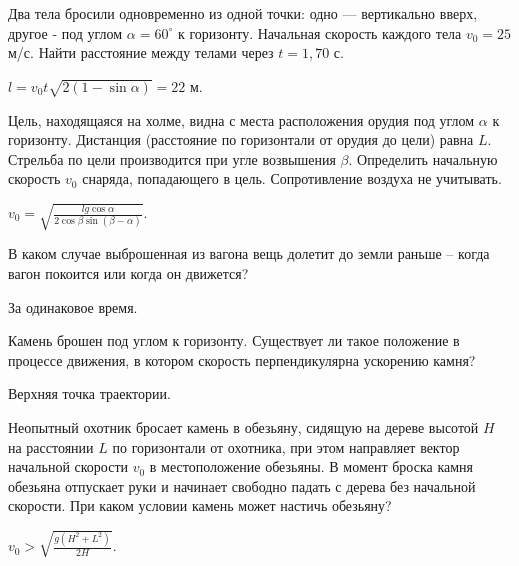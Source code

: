 \begin{ex} %
Два тела бросили одновременно из одной точки: одно — вертикально вверх, другое - под углом $\alpha = 60^{\circ}$ к горизонту. Начальная скорость каждого тела $v_0 = 25$ м/с. Найти расстояние между телами через $t = 1,70$ с.
\begin{ans}
$l = v_0 t \sqrt{2(1-\sin \alpha)} = 22$ м.
\end{ans}
\end{ex}	

\begin{ex} %
Цель, находящаяся на холме, видна с места расположения орудия под углом $\alpha$ к горизонту. Дистанция (расстояние по горизонтали от орудия до цели) равна $L$. Стрельба по цели производится при угле возвышения $\beta$. Определить начальную скорость $v_0$ снаряда, попадающего в цель. Сопротивление воздуха не учитывать.
\begin{ans}
$v_0 = \sqrt{\frac{lg \cos \alpha}{2 \cos \beta \sin \left( \beta - \alpha \right)}}$.
\end{ans}
\end{ex}	

\qualProblems
\begin{ex} %
В каком случае выброшенная из вагона вещь долетит до земли раньше -- когда вагон покоится или когда он движется?
\begin{ans}
За одинаковое время.
\end{ans}
\end{ex}	

\begin{ex} %
Камень брошен под углом к горизонту. Существует ли такое положение в процессе движения, в котором скорость перпендикулярна ускорению камня?
\begin{ans}
Верхняя точка траектории.
\end{ans}
\end{ex}	

\begin{ex} %
Неопытный охотник бросает камень в обезьяну, сидящую на дереве высотой $H$ на расстоянии $L$ по горизонтали от охотника, при этом направляет вектор начальной скорости $v_0$ в местоположение обезьяны. В момент броска камня обезьяна отпускает руки и начинает свободно падать с дерева без начальной скорости. При каком условии камень может настичь обезьяну? 
\begin{ans}
$v_0 > \sqrt{\frac{g(H^2+L^2)}{2H}}$.
\end{ans}
\end{ex}	

